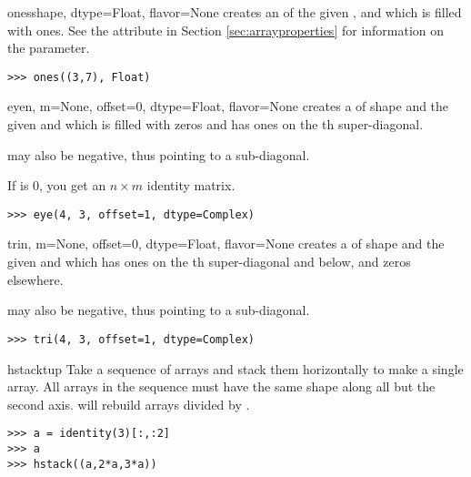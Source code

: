 \begin{funcdesc}{ones}{shape, dtype=Float, flavor=None}
   creates an  of the given ,
   and  which is filled with ones. See the
   attribute in Section \ref{sec:arrayproperties} for
  information on the  parameter.
\begin{verbatim}
>>> ones((3,7), Float)
\end{verbatim}
\end{funcdesc}

\begin{funcdesc}{eye}{n, m=None, offset=0, dtype=Float, flavor=None}
   creates a  of shape  and
  the given  and  which is filled with
  zeros and has ones on the th super-diagonal. 

   may also be negative, thus pointing to a sub-diagonal.

  If  is 0, you get an $n\times m$ identity matrix.

\begin{verbatim}
>>> eye(4, 3, offset=1, dtype=Complex)
\end{verbatim}
\end{funcdesc}

\begin{funcdesc}{tri}{n, m=None, offset=0, dtype=Float, flavor=None}
   creates a  of shape  and
  the given  and  which has ones on the 
  th super-diagonal and below, and zeros elsewhere.

   may also be negative, thus pointing to a sub-diagonal.

\begin{verbatim}
>>> tri(4, 3, offset=1, dtype=Complex)
\end{verbatim}
\end{funcdesc}

\begin{funcdesc}{hstack}{tup}
  Take a sequence of arrays and stack them horizontally to make a single array.
  All arrays in the sequence must have the same shape along all but the second
  axis.  will rebuild arrays divided by .
  
\begin{verbatim}
>>> a = identity(3)[:,:2]
>>> a
>>> hstack((a,2*a,3*a))
\end{verbatim}
\end{funcdesc}

